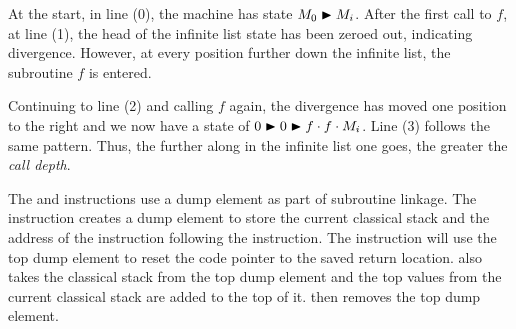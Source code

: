 At the start, in line (0), the machine has state $M_0\blacktriangleright M_i$. After the
first call to $f$, at line (1), 
the head of the infinite list state has been zeroed out, 
indicating divergence. However, at every position further down the
infinite list, the subroutine $f$ is entered.

Continuing to line (2) and calling $f$ again, the divergence has moved 
one position to the right and we now have a state of
 $0\blacktriangleright 0\blacktriangleright f \cdot f \cdot M_i$. Line (3) follows the same pattern.
 Thus, the further 
along in the infinite list one goes, the greater the \emph{call depth}.


The  and  instructions use a dump element
as part of subroutine linkage.
The  instruction creates a dump element to store 
the 
current classical stack and the address of the instruction following
the  instruction. 
The  instruction will use the top dump element
to reset the code pointer  to the saved return location.
 also takes the classical stack from the top dump element and the
top  values from the current classical stack are added
to the top of it.  then removes the top dump element.


